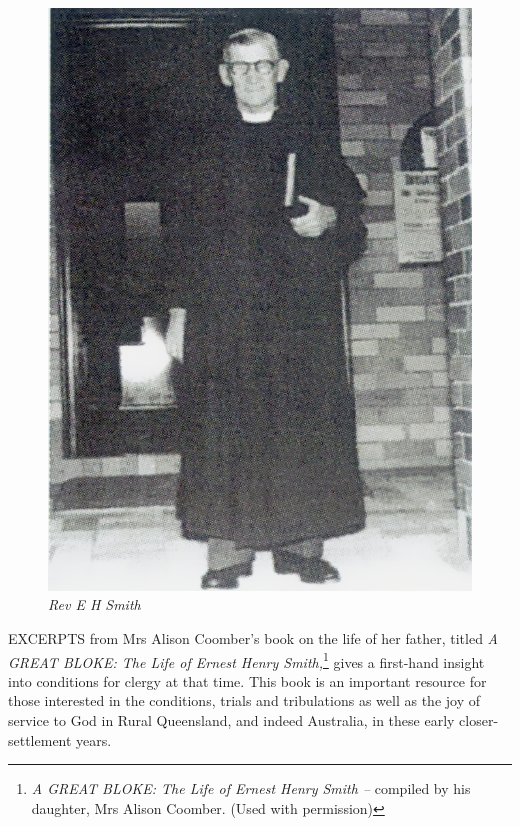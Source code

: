 \begin{figure}
\begin{center}
\includegraphics[width=1.\linewidth,center]{../images/EHSmith.png}
\caption{\itshape Rev E H Smith}
\end{center}
\end{figure}




\lettrine[lines=3]{E}{XCERPTS}
 from Mrs Alison Coomber's book on the life of her father, titled \emph{A GREAT BLOKE: The Life of Ernest Henry Smith,}\footnote{\emph{A GREAT BLOKE: The Life of Ernest Henry Smith --} compiled by his daughter, Mrs Alison Coomber. (Used with permission)} gives a first-hand insight into conditions for clergy at that time. This book is an important resource for those interested in the conditions, trials and tribulations as well as the joy of service to God in Rural Queensland, and indeed Australia, in these early closer-settlement years.


